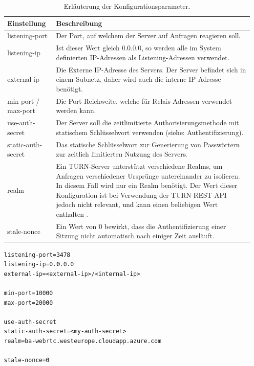 \begin{table}[ht]
\centering
\begin{tabularx}{\textwidth}{lX}
\toprule
Einstellung&Beschreibung\\

\midrule
listening-port&Der Port, auf welchem der Server auf Anfragen reagieren soll.\\
listening-ip&Ist dieser Wert gleich 0.0.0.0, so werden alle im System definierten IP-Adressen als Listening-Adressen verwendet.\\
external-ip&Die Externe IP-Adresse des Servers. Der Server befindet sich in einem Subnetz, daher wird auch die interne IP-Adresse benötigt.\\
min-port / max-port&Die Port-Reichweite, welche für Relais-Adressen verwendet werden kann.\\
use-auth-secret&Der Server soll die zeitlimitierte Authorisierungsmethode mit statischem Schlüsselwort verwenden (siehe: Authentifizierung).\\
static-auth-secret&Das statische Schlüsselwort zur Generierung von Passwörtern zur zeitlich limitierten Nutzung des Servers.\\
realm&Ein TURN-Server unterstützt verschiedene \glqq{}Realms\grqq{}, um Anfragen verschiedener Ursprünge untereinander zu isolieren. In diesem Fall wird nur ein \glqq{}Realm\grqq{} benötigt. Der Wert dieser Konfiguration ist bei Verwendung der TURN-REST-API jedoch nicht relevant, und kann einen beliebigen Wert enthalten \cite{turnrestRFC}.\\
stale-nonce&Ein Wert von 0 bewirkt, dass die Authentifizierung einer Sitzung nicht automatisch nach einiger Zeit ausläuft.\\
\bottomrule

\end{tabularx}
\caption{Erläuterung der Konfigurationsparameter.}
\label{table:coturnConfig}
\end{table}

\lstset{style=STYLE_COMMAND_LINE_ARGUMENT_SINGLE_LINE}
\begin{singlespace}
\begin{minipage}{\textwidth}
\begin{lstlisting}[caption={Coturn-Konfigurationsdatei -- turnserver.conf}, captionpos=b, label={lst:coturnConfig}]
listening-port=3478
listening-ip=0.0.0.0
external-ip=<external-ip>/<internal-ip>

min-port=10000
max-port=20000

use-auth-secret
static-auth-secret=<my-auth-secret>
realm=ba-webrtc.westeurope.cloudapp.azure.com

stale-nonce=0
\end{lstlisting}
\end{minipage}
\end{singlespace}

